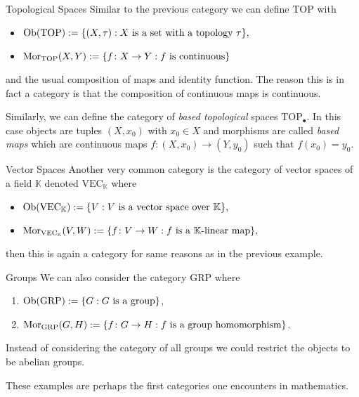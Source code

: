 \begin{example}{Topological Spaces}{}
Similar to the previous category we can define $\mathrm{TOP}$ with
\begin{itemize}
    \item $\mathrm {Ob}(\mathrm{TOP}) := \{(X,\tau) : \text{$X$ is a set with a topology $\tau$}\},$
    \item $\mathrm {Mor}_{\mathrm{TOP}}(X,Y) := \{f\colon X \to Y: \text{$f$ is continuous}\}$
\end{itemize}
and the usual composition of maps and identity function. The reason this is in fact a category is that the composition of continuous maps is continuous.

Similarly, we can define the category of \emph{based topological} spaces $\mathrm{TOP}_\bullet$. In this case objects are tuples $(X,x_0)$ with $x_0 \in X$ and morphisms are called \emph{based maps} which are continuous maps $f\colon (X,x_0) \to (Y,y_0)$ such that $f(x_0) = y_0$.
\end{example}

\begin{example}{Vector Spaces}{}
Another very common category is the category of vector spaces of a field $\mathbb{K}$ denoted $\mathrm{VEC}_\mathbb{K}$ where
\begin{itemize}
    \item $\mathrm {Ob}(\mathrm{VEC}_\mathbb{K}) := \{V : \text{$V$ is a vector space over $\mathbb{K}$}\},$
    \item $\mathrm {Mor}_{\mathrm{VEC}_\mathbb{K}}(V,W) := \{f\colon V \to W : \text{$f$ is a $\mathbb{K}$-linear map}\},$
\end{itemize}
then this is again a category for same reasons as in the previous example.
\end{example}

\begin{example}{Groups}{}
We can also consider the category $\mathrm{GRP}$ where
\begin{enumerate}
    \item $\mathrm {Ob}(\mathrm{GRP}) := \{G : \text{$G$ is a group}\}$,
    \item $\mathrm {Mor}_{\mathrm{GRP}}(G,H) := \{f\colon G \to H : \text{$f$ is a group homomorphism}\}$.
\end{enumerate}
Instead of considering the category of all groups we could restrict the objects to be abelian groups.
\end{example}

These examples are perhaps the first categories one encounters in mathematics. 


